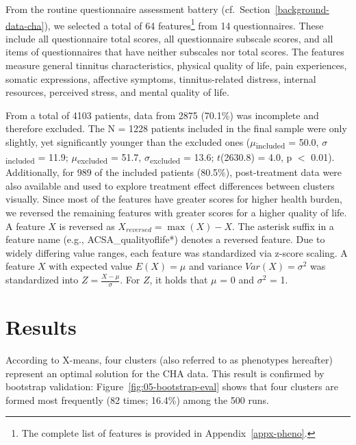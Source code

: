 \documentclass[
  oneside]{book}
\begin{document}
From the routine questionnaire assessment battery (cf.~Section~\ref{background-data-cha}), we selected a total of 64 features\footnote{The complete list of features is provided in Appendix~\ref{appx-pheno}.} from 14 questionnaires.
These include all questionnaire total scores, all questionnaire subscale scores, and all items of questionnaires that have neither subscales nor total scores.
The features measure
general tinnitus characteristics,
physical quality of life,
pain experiences,
somatic expressions,
affective symptoms,
tinnitus-related distress,
internal resources,
perceived stress, and
mental quality of life.

From a total of 4103 patients, data from 2875 (70.1\%) was incomplete and therefore excluded.
The N = 1228 patients included in the final sample were only slightly, yet significantly younger than the excluded ones (\(\mu\)\textsubscript{included} = 50.0, \(\sigma\)\textsubscript{included} = 11.9; \(\mu\)\textsubscript{excluded} = 51.7, \(\sigma\)\textsubscript{excluded} = 13.6; \(t\)(2630.8) = 4.0, p \(<\) 0.01).
Additionally, for 989 of the included patients (80.5\%), post-treatment data were also available and used to explore treatment effect differences between clusters visually.
Since most of the features have greater scores for higher health burden, we reversed the remaining features with greater scores for a higher quality of life.
A feature \(X\) is reversed as \(X_{reversed} = \max{(X)} - X\).
The asterisk suffix in a feature name (e.g., ACSA\_qualityoflife*) denotes a reversed feature.
Due to widely differing value ranges, each feature was standardized via z-score scaling.
A feature \(X\) with expected value \(E(X)=\mu\) and variance \(Var(X) = \sigma^2\) was standardized into \(Z = \frac{X - \mu}{\sigma}\).
For \(Z\), it holds that \(\mu\) = 0 and \(\sigma^2\) = 1.

\hypertarget{phenotypes-results}{%
\section{Results}\label{phenotypes-results}}

According to X-means, four clusters (also referred to as phenotypes hereafter) represent an optimal solution for the CHA data.
This result is confirmed by bootstrap validation: Figure~\ref{fig:05-bootstrap-eval} shows that four clusters are formed most frequently (82 times; 16.4\%) among the 500 runs.
\end{document}
